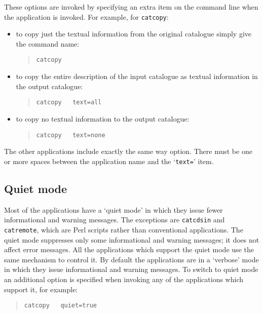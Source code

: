 \documentclass[twoside,11pt]{article}
\renewcommand{\_}{\texttt{\symbol{95}}}
\begin{document}
These options are invoked by specifying an extra item on the command
line when the application is invoked.  For example, for {\tt catcopy}:

\begin{itemize}

  \item to copy just the textual information from the original
   catalogue simply give the command name:

  \begin{verse}
   {\tt catcopy}
  \end{verse}

  \item to copy the entire description of the input catalogue as
   textual information in the output catalogue:

  \begin{verse}
   {\tt catcopy ~ text=all}
  \end{verse}

  \item to copy no textual information to the output catalogue:

  \begin{verse}
   {\tt catcopy ~ text=none}
  \end{verse}

\end{itemize}

The other applications include exactly the same way option.  There must be
one or more spaces between the application name and the `{\tt text=}' item.

\subsection{\label{QUIET}Quiet mode}

Most of the applications have a `quiet mode' in which they issue fewer
informational and warning messages.  The exceptions are {\tt catcdsin}
and {\tt catremote}, which are Perl scripts rather than conventional
applications.  The quiet mode suppresses only some informational and
warning messages; it does not affect error messages.  All the applications
which support the quiet mode use the same mechanism to control it.
By default the applications are in a `verbose' mode in which they
issue informational and warning messages.  To switch to quiet mode an
additional option is specified when invoking any of the applications which
support it, for example:

\begin{verse}
{\tt catcopy ~ quiet=true}
\end{verse}
\end{document}

